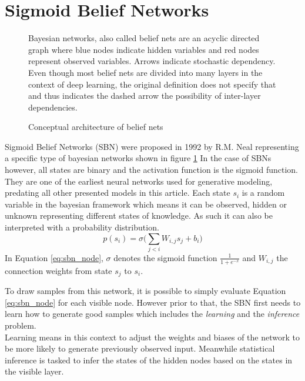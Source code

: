 \section{Sigmoid Belief Networks}
\label{sec:sbn}
\begin{figure}[htb]
\centering

  \caption[Architecture of Sigmoid Belief Nets]{Conceptual architecture of belief nets}
  \label{fig:sbn_arch}
  \medskip
  \small
  Bayesian networks, also called belief nets are an acyclic directed graph where blue nodes indicate hidden variables and red nodes represent observed variables.
  Arrows indicate stochastic dependency.
  Even though most belief nets are divided into many layers in the context of deep learning, the original definition does not specify that and thus indicates the dashed arrow the possibility of inter-layer dependencies.
\end{figure}

Sigmoid Belief Networks (SBN) were proposed in 1992 by R.M. Neal \cite{neal:1992} representing a specific type of bayesian networks \cite{pearl:1985} shown in figure \ref{fig:sbn_arch}
In the case of SBNs however, all states are binary and the activation function is the sigmoid function. They are one of the earliest neural networks used for generative modeling, predating all other presented models in this article.
Each state $s_i$ is a random variable in the bayesian framework which means it can be observed, hidden or unknown representing different states of knowledge. As such it can also be interpreted with a probability distribution.
\begin{equation}
  \label{eq:sbn_node}
p(s_i) = \sigma\bigg(\sum_{j<i}W_{i,j}s_j+b_i\bigg)
\end{equation}
In Equation \ref{eq:sbn_node}, $\sigma$ denotes the sigmoid function $\frac{1}{1 + e^{-x}}$ and $W_{i,j}$ the connection weights from state $s_j$ to $s_i$.

To draw samples from this network, it is possible to simply evaluate Equation \ref{eq:sbn_node} for each visible node.
However prior to that, the SBN first needs to learn how to generate good samples which includes the \emph{learning} and the \emph{inference} problem.\\
Learning means in this context to adjust the weights and biases of the network to be more likely to generate previously observed input.
Meanwhile statistical inference is tasked to infer the states of the hidden nodes based on the states in the visible layer.\\

